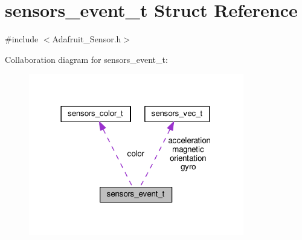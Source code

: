 \hypertarget{structsensors__event__t}{}\section{sensors\+\_\+event\+\_\+t Struct Reference}
\label{structsensors__event__t}


{\ttfamily \#include $<$Adafruit\+\_\+\+Sensor.\+h$>$}



Collaboration diagram for sensors\+\_\+event\+\_\+t\+:
\nopagebreak
\begin{figure}[H]
\begin{center}
\leavevmode
\includegraphics[width=266pt]{structsensors__event__t__coll__graph}
\end{center}
\end{figure}
